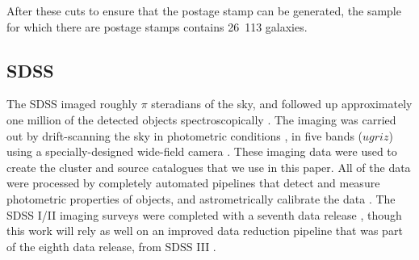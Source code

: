 \documentclass[twocolumn,useAMS,usenatbib]{mn2e}
\begin{document}
After these cuts to ensure that the postage stamp can be generated,
the sample for which there are postage stamps contains 26~113 galaxies.

\subsection{SDSS}\label{SS:sdss}

The SDSS \citep{2000AJ....120.1579Y} imaged roughly $\pi$ steradians
of the sky, and followed up approximately one million of the detected
objects spectroscopically \citep{2001AJ....122.2267E,
  2002AJ....123.2945R,2002AJ....124.1810S}. The imaging was carried
out by drift-scanning the sky in photometric conditions
\citep{2001AJ....122.2129H, 2004AN....325..583I}, in five bands
($ugriz$) \citep{1996AJ....111.1748F, 2002AJ....123.2121S} using a
specially-designed wide-field camera
\citep{1998AJ....116.3040G}. These imaging data were used to create
the cluster and source catalogues that we use in this paper.  All of
the data were processed by completely automated pipelines that detect
and measure photometric properties of objects, and astrometrically
calibrate the data \citep{2001ASPC..238..269L,
  2003AJ....125.1559P,2006AN....327..821T}. The SDSS I/II imaging surveys were completed
with a seventh data release \citep{2009ApJS..182..543A}, though this
work will rely as well on an improved data reduction pipeline that was
part of the eighth data release, from SDSS III \citep{2011ApJS..193...29A}.

\end{document}
